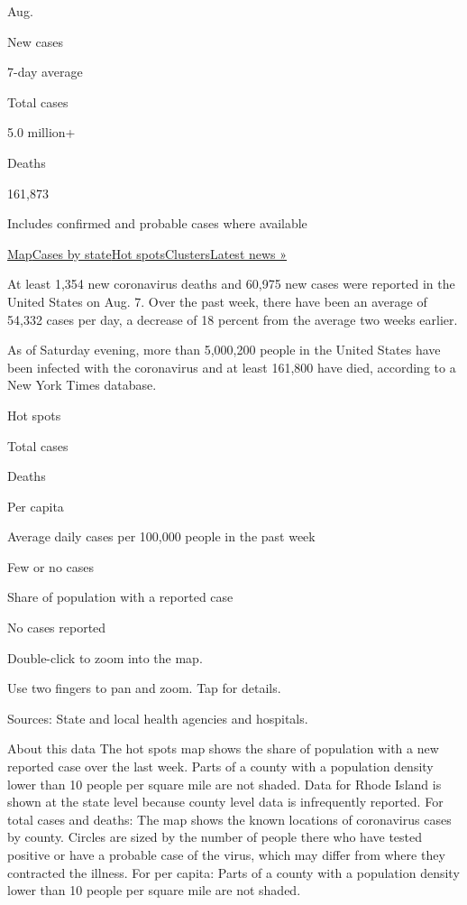 Aug.

New cases

7-day average

Total cases

5.0 million+

Deaths

161,873

Includes confirmed and probable cases where available

\protect\hyperlink{map}{Map}\protect\hyperlink{states}{Cases by
state}\protect\hyperlink{hotspots}{Hot
spots}\protect\hyperlink{clusters}{Clusters}\href{https://www.nytimes.com/2020/08/08/world/coronavirus-covid-19.html}{Latest
news »}

At least 1,354 new coronavirus deaths and 60,975 new cases were reported
in the United States on Aug. 7. Over the past week, there have been an
average of 54,332 cases per day, a decrease of 18 percent from the
average two weeks earlier.

As of Saturday evening, more than 5,000,200 people in the United States
have been infected with the coronavirus and at least 161,800 have died,
according to a New York Times database.

Hot spots

Total cases

Deaths

Per capita

Average daily cases per 100,000 people in the past week

Few or no cases

Share of population with a reported case

No cases reported

Double-click to zoom into the map.

Use two fingers to pan and zoom. Tap for details.

Sources: State and local health agencies and hospitals.

About this data The hot spots map shows the share of population with a
new reported case over the last week. Parts of a county with a
population density lower than 10 people per square mile are not shaded.
Data for Rhode Island is shown at the state level because county level
data is infrequently reported. For total cases and deaths: The map shows
the known locations of coronavirus cases by county. Circles are sized by
the number of people there who have tested positive or have a probable
case of the virus, which may differ from where they contracted the
illness. For per capita: Parts of a county with a population density
lower than 10 people per square mile are not shaded.

